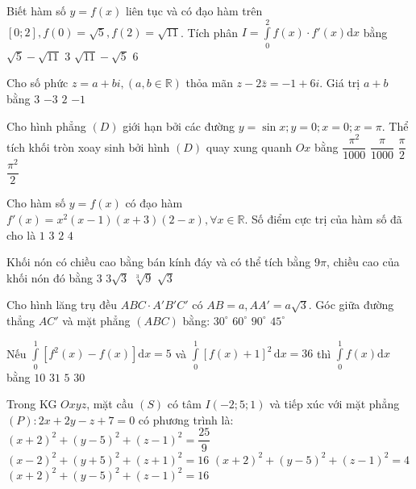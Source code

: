 \begin{ex}%
Biết hàm số $y=f(x)$ liên tục và có đạo hàm trên $[0; 2], f(0)= \sqrt{5}, f(2)=\sqrt{11}$. Tích phân $I=\displaystyle\int\limits_0^2 f(x) \cdot f'(x) \mathrm{d} x$ bằng
\choice
{$\sqrt{5}-\sqrt{11}$}
{\True $3$}
{$\sqrt{11}-\sqrt{5}$}
{$6$}

\end{ex}
\begin{ex}%
Cho số phức $z=a+b i,(a, b \in \mathbb{R})$ thỏa mãn $z-2\bar{z}=-1+6 i$. Giá trị $a+b$ bằng
\choice
{\True $3$}
{$-3$}
{$2$}
{$-1$}

\end{ex}
\begin{ex}%
Cho hình phẳng $(D)$ giới hạn bởi các đường $y=\sin x; y=0; x=  0; x=\pi$. Thể tích khối tròn xoay sinh bởi hình $(D)$ quay xung quanh $O x$ bằng
\choice
{$\dfrac{\pi^2}{1000}$}
{$\dfrac{\pi}{1000}$}
{$\dfrac{\pi}{2}$}
{\True $\dfrac{\pi^2}{2}$}

\end{ex}
\begin{ex}%
Cho hàm số $y=f(x)$ có đạo hàm $f'(x)=x^2(x-1)(x+3)(2- x), \forall x \in \mathbb{R}$. Số điểm cực trị của hàm số đã cho là
\choice
{$1$}
{\True $3$}
{$2$}
{$4$}

\end{ex}
\begin{ex}%
Khối nón có chiều cao bằng bán kính đáy và có thể tích bằng $9\pi$, chiều cao của khối nón đó bằng
\choice
{\True $3$}
{$3\sqrt{3}$}
{$\sqrt[3]{9}$}
{$\sqrt{3}$}

\end{ex}
\begin{ex}%
Cho hình lăng trụ đều $ABC \cdot A'B'C'$ có $AB=a, AA'=a \sqrt{3}$. Góc giữa đường thẳng $AC'$ và mặt phẳng $(ABC)$ bằng:
\choice
{$30^{\circ}$}
{\True $60^{\circ}$}
{$90^{\circ}$}
{$45^{\circ}$}

\end{ex}
\begin{ex}%
Nếu $\displaystyle\int\limits_0^1\left[f^2(x)-f(x)\right] \mathrm{d} x=5$ và $\displaystyle\int\limits_0^1[f(x)+1]^2 \mathrm{\,d} x=36$ thì $\displaystyle\int\limits_0^1 f(x) \mathrm{d} x$ bằng
\choice
{\True $10$}
{$31$}
{$5$}
{$30$}

\end{ex}
\begin{ex}%
Trong KG $Oxyz$, mặt cầu $(S)$ có tâm $I(-2; 5; 1)$ và tiếp xúc với mặt phẳng $(P)\colon 2 x+2 y-z+7=0$ có phương trình là:
\choice
{$(x+2)^2+(y-5)^2+(z-1)^2=\dfrac{25}{9}$}
{$(x-2)^2+(y+5)^2+(z+1)^2=16$}
{$(x+2)^2+(y-5)^2+(z-1)^2=4$}
{\True $(x+2)^2+(y-5)^2+(z-1)^2=16$}

\end{ex}

